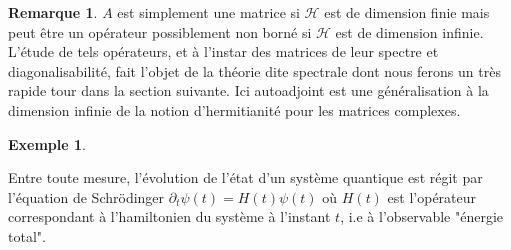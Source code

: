 \documentclass[12pt,openany,a4paper, titlepage]{article}
\newcommand{\HH}{\mathcal{H}}
\theoremstyle{definition}
\theoremstyle{definition}
\theoremstyle{definition}
\newtheorem{ex}{Exemple}
\theoremstyle{definition}
\theoremstyle{definition}
\newtheorem{rem}{Remarque}
\theoremstyle{definition}
\begin{document}
\begin{rem}
    $A$ est simplement une matrice si $\HH$ est de dimension finie mais peut être un opérateur possiblement non borné si $\HH$ est de dimension infinie. L'étude de tels opérateurs, et à l'instar des matrices de leur spectre et diagonalisabilité, fait l'objet de la théorie dite spectrale dont nous ferons un très rapide tour dans la section suivante. Ici autoadjoint est une généralisation à la dimension infinie de la notion d'hermitianité pour les matrices complexes.
\end{rem}

\begin{ex}
    
\end{ex}


\vspace{3mm}
\begin{tcolorbox}[colback=gray!5!white,
                  colframe=gray!80!white,
                  title= Postulat 3 : Principe de quantification ]

\end{tcolorbox}
\vspace{3mm}

\vspace{3mm}
\begin{tcolorbox}[colback=gray!5!white,
                  colframe=gray!80!white,
                  title= Postulat 4 : Principe de décomposition spectrale ]

\end{tcolorbox}
\vspace{3mm}

\vspace{3mm}
\begin{tcolorbox}[colback=gray!5!white,
                  colframe=gray!80!white,
                  title= Postulat 5 : Principe de réduction du paquet d’onde ]

\end{tcolorbox}
\vspace{3mm}

\vspace{3mm}
\begin{tcolorbox}[colback=gray!5!white,
                  colframe=gray!80!white,
                  title= Postulat 6 : Evolution d'un système dans le temps ]
Entre toute mesure, l'évolution de l'état d'un système quantique est régit par l'équation de Schrödinger 
$\partial_t \psi(t) = H(t)\psi(t)$
où $H(t)$ est l'opérateur correspondant à l'hamiltonien du système à l'instant $t$, i.e à l'observable "énergie total".
\end{tcolorbox}
\vspace{3mm}
\end{document}
